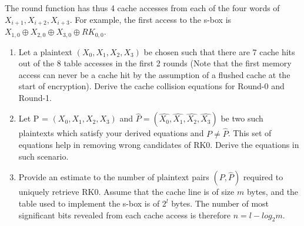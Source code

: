 \documentclass{article}
\begin{document}
\begin{questions}
The round function has thus 4 cache accesses from each of the four words of $X_{i+1},X_{i+2}, X_{i+3}$. 
For example, the first access to the 
s-box is $X_{1,0} \oplus X_{2,0} \oplus X_{3,0} \oplus RK_{0,0}$.

\begin{enumerate}
\item Let a plaintext $(X_0 , X_1 , X_2 , X_3)$ be chosen such that there are 7 cache hits out of the 8 table accesses in the first 2 rounds (Note that the first memory access can never be a cache hit by the assumption of a flushed cache at the start of encryption). Derive the cache collision equations for Round-0 and Round-1. 


\item Let P = $(X_0 , X_1 , X_2 , X_3)$ and $\hat{P} = (\hat{X_0}, \hat{X_1},\hat{X_2},\hat{X_3})$ be two such plaintexts which satisfy your derived equations and $P \neq \hat{P}$. This set of equations help in removing wrong candidates of RK0. 
Derive the equations in such scenario.


\item Provide an estimate to the number of plaintext pairs $(P,\hat{P})$ required to uniquely retrieve RK0. Assume that the cache line is of size $m$ bytes, and the table used to implement the s-box is of $2^l$ bytes. The number of most significant bits revealed from each cache access is therefore $n = l - log_2m$.

\end{enumerate}






\end{questions}
\end{document}
